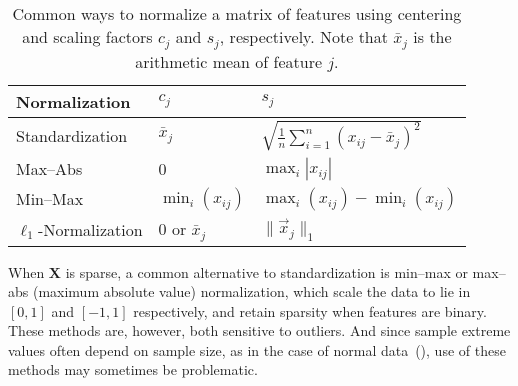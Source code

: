 \begin{table}[hbt]
  \centering
  \caption{
    Common ways to normalize a matrix of features using centering and scaling
    factors \(c_j\) and \(s_j\), respectively. Note that \(\bar{x}_j\) is
    the arithmetic mean of feature \(j\).
  }
  \label{tab:normalization-types}
  \vskip 0.15in
  \small
  \begin{tabular}{lll}
    \toprule
    Normalization            & \(c_{j}\)          & \(s_j\)                                                   \\
    \midrule
    Standardization          & \(\bar{x}_j\)      & \(\sqrt{\frac{1}{n}\sum_{i=1}^n (x_{ij} - \bar{x}_j)^2}\) \\
    \addlinespace
    Max--Abs                 & 0                  & \(\max_i|x_{ij}|\)                                        \\
    \addlinespace
    Min--Max                 & \(\min_i(x_{ij})\) & \(\max_i(x_{ij}) - \min_i(x_{ij})\)                       \\
    \addlinespace
    \(\ell_1\)-Normalization & 0 or \(\bar{x}_j\) & \(\lVert \vec{x}_j\rVert_1\)                              \\
    \bottomrule
  \end{tabular}
\end{table}

When \(\bm{X}\) is sparse, a common alternative to standardization is min--max or max--abs
(maximum absolute value) normalization, which scale the data to lie in \([0, 1]\) and
\([-1, 1]\) respectively, and retain sparsity when features are binary. These methods are,
however, both sensitive to outliers. And since sample extreme values often depend on sample
size, as in the case of normal data~(), use of these methods may
sometimes be problematic.

